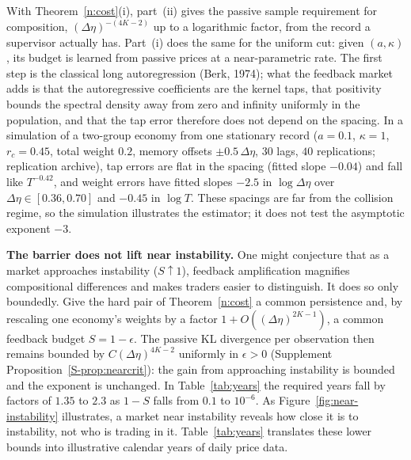 \documentclass[11pt,letterpaper]{article}
\theoremstyle{definition}
\begin{document}
With Theorem~\ref{n:cost}(i), part~(ii) gives the passive sample requirement for composition, $(\Delta\eta)^{-(4K-2)}$ up to a logarithmic factor, from the record a supervisor actually has. Part~(i) does the same for the uniform cut: given $(a, \kappa)$, its budget is learned from passive prices at a near-parametric rate. The first step is the classical long autoregression (Berk, 1974); what the feedback market adds is that the autoregressive coefficients are the kernel taps, that positivity bounds the spectral density away from zero and infinity uniformly in the population, and that the tap error therefore does not depend on the spacing. In a simulation of a two-group economy from one stationary record ($a = 0.1$, $\kappa = 1$, $r_c = 0.45$, total weight $0.2$, memory offsets $\pm 0.5\,\Delta\eta$, $30$ lags, $40$ replications; replication archive), tap errors are flat in the spacing (fitted slope $-0.04$) and fall like $T^{-0.42}$, and weight errors have fitted slopes $-2.5$ in $\log\Delta\eta$ over $\Delta\eta \in [0.36, 0.70]$ and $-0.45$ in $\log T$. These spacings are far from the collision regime, so the simulation illustrates the estimator; it does not test the asymptotic exponent $-3$.

\textbf{The barrier does not lift near instability.} One might conjecture that as a market approaches instability ($S \uparrow 1$), feedback amplification magnifies compositional differences and makes traders easier to distinguish. It does so only boundedly. Give the hard pair of Theorem~\ref{n:cost} a common persistence and, by rescaling one economy's weights by a factor $1 + O((\Delta\eta)^{2K-1})$, a common feedback budget $S = 1 - \epsilon$. The passive KL divergence per observation then remains bounded by $C(\Delta\eta)^{4K-2}$ uniformly in $\epsilon > 0$ (Supplement Proposition~\ref{S-prop:nearcrit}): the gain from approaching instability is bounded and the exponent is unchanged. In Table~\ref{tab:years} the required years fall by factors of $1.35$ to $2.3$ as $1 - S$ falls from $0.1$ to $10^{-6}$. As Figure~\ref{fig:near-instability} illustrates, a market near instability reveals how close it is to instability, not who is trading in it. Table~\ref{tab:years} translates these lower bounds into illustrative calendar years of daily price data.
\end{document}
